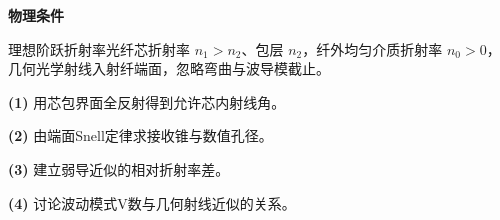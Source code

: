 \textbf{物理条件}\par 理想阶跃折射率光纤芯折射率 \(n_1>n_2\)、包层 \(n_2\)，纤外均匀介质折射率 \(n_0>0\)，几何光学射线入射纤端面，忽略弯曲与波导模截止。
\par\noindent\textbf{(1)} 用芯包界面全反射得到允许芯内射线角。
\par\noindent\textbf{(2)} 由端面Snell定律求接收锥与数值孔径。
\par\noindent\textbf{(3)} 建立弱导近似的相对折射率差。
\par\noindent\textbf{(4)} 讨论波动模式V数与几何射线近似的关系。
